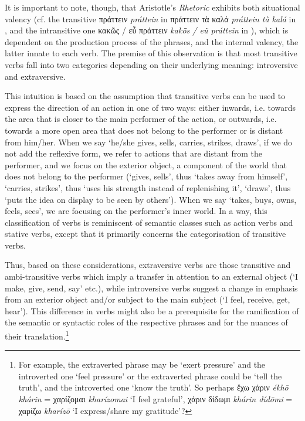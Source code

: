 \documentclass[output=paper,colorlinks,citecolor=brown]{langscibook}
\begin{document}
It is important to note, though, that Aristotle’s \textit{Rhetoric} exhibits both situational valency (cf. the transitive πράττειν \textit{práttein} in πράττειν τὰ καλά \textit{práttein tà kalá} in , and the intransitive one κακῶς / εὖ πράττειν \textit{kakō̃s / eũ práttein} in ), which is dependent on the production process of the phrases, and the internal valency, the latter innate to each verb. The premise of this observation is that most transitive verbs fall into two categories depending on their underlying meaning: introversive and extraversive. 

This intuition is based on the assumption that transitive verbs can be used to express the direction of an action in one of two ways: either inwards, i.e. towards the area that is closer to the main performer of the action, or outwards, i.e. towards a more open area that does not belong to the performer or is distant from him/her. When we say ‘he/she gives, sells, carries, strikes, draws’, if we do not add the reflexive form, we refer to actions that are distant from the performer, and we focus on the exterior object, a component of the world that does not belong to the performer (‘gives, sells’, thus ‘takes away from himself’, ‘carries, strikes’, thus ‘uses his strength instead of replenishing it’, ‘draws’, thus ‘puts the idea on display to be seen by others’). When we say ‘takes, buys, owns, feels, sees’, we are focusing on the performer's inner world. In a way, this classification of verbs is reminiscent of semantic classes such as action verbs and stative verbs, except that it primarily concerns the categorisation of transitive verbs.

Thus, based on these considerations, extraversive verbs are those transitive and ambi-transitive verbs which imply a transfer in attention to an external object (‘I make, give, send, say’ etc.), while introversive verbs suggest a change in emphasis from an exterior object and/or subject to the main subject (‘I feel, receive, get, hear’). This difference in verbs might also be a prerequisite for the ramification of the semantic or syntactic roles of the respective phrases and for the nuances of their translation.\footnote{For example, the extraverted phrase may be ‘exert pressure' and the introverted one ‘feel pressure' or the extraverted phrase could be ‘tell the truth', and the introverted one ‘know the truth'. So perhaps ἔχω χάριν \textit{ékhō khárin} = χαρίζομαι \textit{kharízomai} ‘I feel grateful’, χάριν δίδωμι \textit{khárin dídōmi} = χαρίζω \textit{kharízō} ‘I express/share my gratitude’?}
\end{document}
